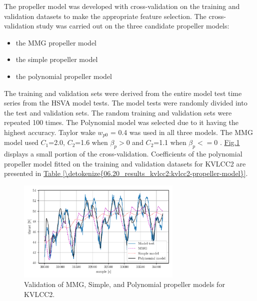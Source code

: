 \noindent The propeller model was developed with cross-validation on the training and validation datasets to make the appropriate feature selection.
The cross-validation study was carried out on the three candidate propeller models: 
\begin{itemize}
    \item the MMG propeller model
    \item the simple propeller model
    \item the polynomial propeller model
\end{itemize}
The training and validation sets were derived from the entire model test time series from the HSVA model tests. The model tests were randomly divided into the test and validation sets. The random training and validation sets were repeated 100 times. The Polynomial model was selected due to it having the highest accuracy. Taylor wake \(w_{p0}\) = {0.4} was used in all three models. The MMG model used \(C_1\)={2.0}, \(C_2\)={1.6} when \(\beta_p>0\) and \(C_2\)={1.1} when \(\beta_p<=0\) \cite{yasukawa_introduction_2015-1}. \hyperref[\detokenize{06.20_results_kvlcc2:fig-propeller-validation}]{Fig.\@ \ref{\detokenize{06.20_results_kvlcc2:fig-propeller-validation}}} displays a small portion of the cross-validation. Coefficients of the polynomial propeller model fitted on the training and validation datasets for KVLCC2 are presented in \hyperref[\detokenize{06.20_results_kvlcc2:kvlcc2-propeller-model}]{Table \ref{\detokenize{06.20_results_kvlcc2:kvlcc2-propeller-model}}}.

\begin{figure}[!htb]
\centering
\includegraphics[width=0.7\textwidth]{kappa/images/13.pdf}
\caption{Validation of MMG, Simple, and Polynomial propeller models for KVLCC2.}\label{\detokenize{06.20_results_kvlcc2:fig-propeller-validation}}\end{figure}
\newpage
